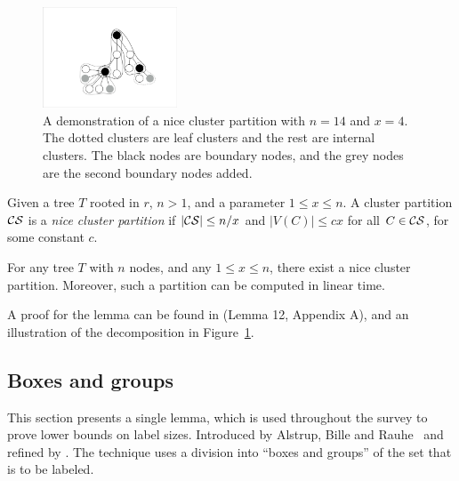 				\begin{figure}[!ht]
				\centering
				\includegraphics[width=40mm]{./Figures/newclustering.pdf}
				\caption{A demonstration of a nice cluster partition with $n=14$ and $x=4$. The dotted clusters are leaf clusters and the rest are internal clusters. The black nodes are boundary nodes, and the grey nodes  are the second boundary nodes added.}
				\label{fig:niceClusterDemo}
			\end{figure}
			
\begin{definition}\label{dfn:nice-cluster-partition}
Given a tree $T$ rooted in $r$, $n>1$, and a parameter $ 1 \leq x \leq n$. A cluster partition $ \mathcal{CS}$ is a \emph{nice cluster partition}  if   $\vert  \mathcal{CS} \vert \leq n/x$  and  $\vert V(C) \vert \leq cx$ for all $C \in  \mathcal{CS}$, for some constant $c$. 
\end{definition}


\begin{lemma}\label{lemma:decomposition}
For any tree $T$ with $n$ nodes, and any  $1 \leq x \leq n$, there exist a nice cluster partition. Moreover, such a partition can be computed in linear time.
\end{lemma}
A proof for the lemma can be found in \cite{alstrup1997finding} (Lemma 12, Appendix A), and an illustration of the decomposition in Figure~\ref{fig:niceClusterDemo}.


\subsection{Boxes and groups}\label{section:boxes-and-groups}

This section presents a single lemma, which is used throughout the survey to prove lower bounds on label sizes. Introduced by Alstrup, Bille and Rauhe~ and refined  by . The technique uses a division  into ``boxes and groups'' of the set that is to be labeled.  

